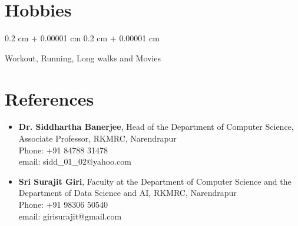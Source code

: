 \documentclass[10pt, letterpaper]{article}
\newenvironment{highlights}{
    \begin{itemize}[
        topsep=0.10 cm,
        parsep=0.10 cm,
        partopsep=0pt,
        itemsep=0pt,
        leftmargin=0.4 cm + 10pt
    ]
}{
    \end{itemize}
} %
\newenvironment{onecolentry}{
    \begin{adjustwidth}{
        0.2 cm + 0.00001 cm
    }{
        0.2 cm + 0.00001 cm
    }
}{
    \end{adjustwidth}
} %
\begin{document}
    \section{Hobbies}
        \begin{onecolentry}
            Workout, Running, Long walks and Movies
        \end{onecolentry}
        
    \section{References}
        \begin{highlights}
                \item \textbf{Dr. Siddhartha Banerjee}, Head of the Department of Computer Science, Associate Professor, RKMRC, Narendrapur \\ Phone: +91 84788 31478 \\email: sidd\_01\_02@yahoo.com
        \end{highlights}

        \begin{highlights}
                \item \textbf{Sri Surajit Giri}, Faculty at the Department of Computer Science and the Department of Data Science and AI, RKMRC, Narendrapur \\ Phone: +91 98306 50540 \\email: girisurajit@gmail.com
        \end{highlights}
\end{document}
